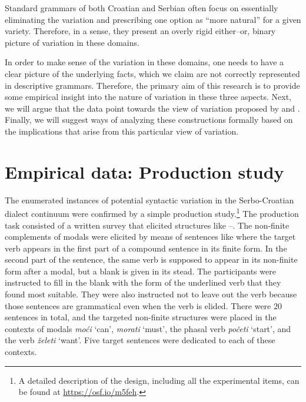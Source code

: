 \documentclass[output=paper,
modfonts,
newtxmath,
hidelinks,
]{langscibook}
\begin{document}
\ea \label{ex4}
	\z
\z

\noindent Standard grammars of both Croatian and Serbian often focus on essentially eliminating the variation and prescribing one option as ``more natural'' for a given variety. Therefore, in a sense, they present an overly rigid either--or, binary picture of variation in these domains.

In order to make sense of the variation in these domains, one needs to have a clear picture of the underlying facts, which we claim are not correctly represented in descriptive grammars. Therefore, the primary aim of this research is to provide some empirical insight into the nature of variation in these three aspects. Next, we will argue that the data point towards the view of variation proposed by  \citet{AdgerTrousdale2007} and \citet{AdgerSmith2005}. Finally, we will suggest ways of analyzing these constructions formally based on the implications that arise from this particular view of variation.

\section{Empirical data: Production study}\label{s2}

The enumerated instances of potential syntactic variation in the Serbo-Croatian dialect continuum were confirmed by a simple production study.\footnote{\label{fn1}A detailed description of the design, including all the experimental items, can be found at \url{https://osf.io/m5feh}.} The production task consisted of a written survey that elicited structures like --. The non-finite complements of modals were elicited by means of sentences like  where the target verb appears in the first part of a compound sentence in its finite form. In the second part of the sentence, the same verb is supposed to appear in its non-finite form after a modal, but a blank is given in its stead. The participants were instructed to fill in the blank with the form of the underlined verb that they found most suitable. They were also instructed not to leave out the verb because those sentences are grammatical even when the verb is elided. There were 20 sentences in total, and the targeted non-finite structures were placed in the contexts of modals \textit{moći} `can', \textit{morati} `must', the phasal verb \textit{početi} `start', and the verb \textit{želeti} `want'. Five target sentences were dedicated to each of these contexts.\largerpage[2]
\end{document}
